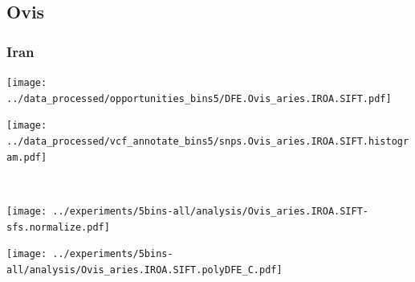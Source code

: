 \subsection{Ovis}

\subsubsection{Iran}

\begin{minipage}{0.49\linewidth}
    \texttt{[image: ../data\_processed/opportunities\_bins5/DFE.Ovis\_aries.IROA.SIFT.pdf]}
\end{minipage}
\begin{minipage}{0.49\linewidth}
    \texttt{[image: ../data\_processed/vcf\_annotate\_bins5/snps.Ovis\_aries.IROA.SIFT.histogram.pdf]}
\end{minipage}
\\
\begin{minipage}{0.49\linewidth}
    \texttt{[image: ../experiments/5bins-all/analysis/Ovis\_aries.IROA.SIFT-sfs.normalize.pdf]}
\end{minipage}
\begin{minipage}{0.4\linewidth}
    \texttt{[image: ../experiments/5bins-all/analysis/Ovis\_aries.IROA.SIFT.polyDFE\_C.pdf]}
\end{minipage}
